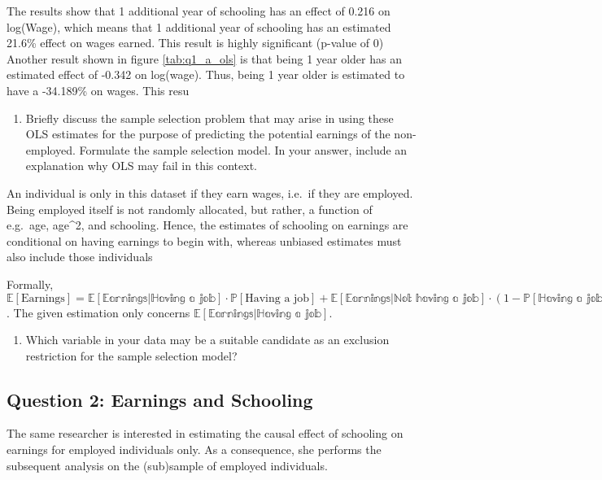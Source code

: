 \documentclass[
]{article}
\providecommand{\tightlist}{%
  \setlength{\itemsep}{0pt}\setlength{\parskip}{0pt}}
\begin{document}
The results show that 1 additional year of schooling has an effect of
0.216 on log(Wage), which means that 1 additional year of schooling has
an estimated 21.6\% effect on wages earned. This result is highly
significant (p-value of 0) Another result shown in figure
\ref{tab:q1_a_ols} is that being 1 year older has an estimated effect of
-0.342 on log(wage). Thus, being 1 year older is estimated to have a
-34.189\% on wages. This resu

\begin{enumerate}
\def\labelenumi{(\alph{enumi})}
\setcounter{enumi}{1}
\tightlist
\item
  Briefly discuss the sample selection problem that may arise in using
  these OLS estimates for the purpose of predicting the potential
  earnings of the non-employed. Formulate the sample selection model. In
  your answer, include an explanation why OLS may fail in this context.
\end{enumerate}

An individual is only in this dataset if they earn wages, i.e.~if they
are employed. Being employed itself is not randomly allocated, but
rather, a function of e.g.~age, age\^{}2, and schooling. Hence, the
estimates of schooling on earnings are conditional on having earnings to
begin with, whereas unbiased estimates must also include those
individuals

Formally,
\(\mathbb{E}[\text{Earnings}] = \mathbb{E[\text{Earnings}|\text{Having a job}]} \cdot \mathbb{P}[\text{Having a job}] + \mathbb{E[\text{Earnings}|\text{Not having a job}]} \cdot (1-\mathbb{P[\text{Having a job}]})\).
The given estimation only concerns
\(\mathbb{E[\text{Earnings}|\text{Having a job}]}\).

\begin{enumerate}
\def\labelenumi{(\alph{enumi})}
\setcounter{enumi}{2}
\tightlist
\item
  Which variable in your data may be a suitable candidate as an
  exclusion restriction for the sample selection model?
\end{enumerate}

\hypertarget{question-2-earnings-and-schooling}{%
\subsection{Question 2: Earnings and
Schooling}\label{question-2-earnings-and-schooling}}

The same researcher is interested in estimating the causal effect of
schooling on earnings for employed individuals only. As a consequence,
she performs the subsequent analysis on the (sub)sample of employed
individuals.
\end{document}
